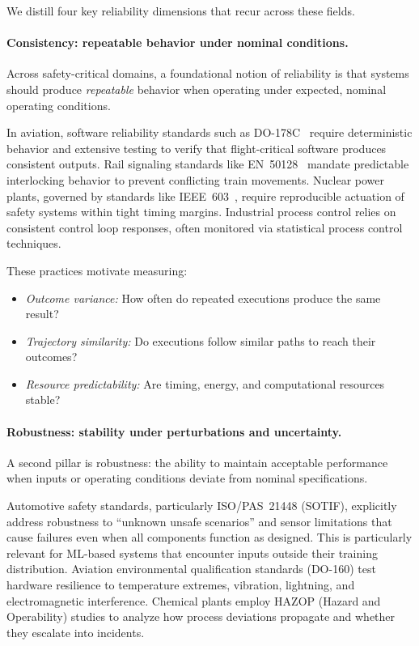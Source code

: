 \documentclass[11pt]{article}
\newcounter{dimension}
\begin{document}
We distill four key reliability dimensions that recur across these fields.

\paragraph{Consistency: repeatable behavior under nominal conditions.}
Across safety-critical domains, a foundational notion of reliability is that systems should produce \emph{repeatable} behavior when operating under expected, nominal operating conditions.

In aviation, software reliability standards such as DO-178C~\citep{do178c} require deterministic behavior and extensive testing to verify that flight-critical software produces consistent outputs.
Rail signaling standards like EN~50128~\citep{boulanger2015cenelec} mandate predictable interlocking behavior to prevent conflicting train movements.
Nuclear power plants, governed by standards like IEEE~603~\citep{stationsieee}, require reproducible actuation of safety systems within tight timing margins.
Industrial process control relies on consistent control loop responses, often monitored via statistical process control techniques.

These practices motivate measuring:
\begin{itemize}[leftmargin=*, topsep=2pt]
    \item \emph{Outcome variance:} How often do repeated executions produce the same result?
    \item \emph{Trajectory similarity:} Do executions follow similar paths to reach their outcomes?
    \item \emph{Resource predictability:} Are timing, energy, and computational resources stable?
\end{itemize}

\paragraph{Robustness: stability under perturbations and uncertainty.}
A second pillar is robustness: the ability to maintain acceptable performance when inputs or operating conditions deviate from nominal specifications.

Automotive safety standards, particularly ISO/PAS~21448 (SOTIF), explicitly address robustness to ``unknown unsafe scenarios'' and sensor limitations that cause failures even when all components function as designed.
This is particularly relevant for ML-based systems that encounter inputs outside their training distribution.
Aviation environmental qualification standards (DO-160) test hardware resilience to temperature extremes, vibration, lightning, and electromagnetic interference.
Chemical plants employ HAZOP (Hazard and Operability) studies to analyze how process deviations propagate and whether they escalate into incidents.
\end{document}
